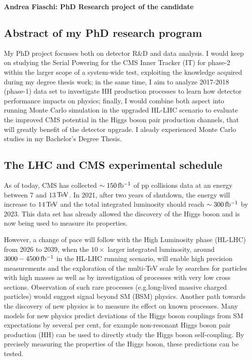 \documentclass[a4paper,11pt,english]{article}
\begin{document}

\pagestyle{plain}
\noindent


\begin{center}
\noindent  \large{\textbf{Andrea Fiaschi: PhD Research project of the candidate}}
\end{center} 
\vspace{-.3cm}
\vspace{-.2cm}
\subsection*{Abstract of my PhD research program}
My PhD project focusses both on detector R\&D and data analysis. I would keep on studying the Serial Powering for the CMS Inner Tracker (IT) for phase-2 within the larger scope of a system-wide test, exploiting the knowledge acquired during my degree thesis work; in the same time, I aim to analyze 2017-2018 (phase-1) data set to investigate HH production processes to learn how detector performance impacts on physics; finally, I would combine both aspect into running Monte Carlo simulation in the upgraded HL-LHC scenario to evaluate the improved CMS potential in the Higgs boson pair production channels, that will greatly benefit of the detector upgrade. I aleady experienced Monte Carlo studies in my Bachelor’s Degree Thesis\cite{TesiTriennale}.
\subsection*{The LHC and CMS experimental schedule}
As of today, CMS has collected $\sim 150{\rm \, fb^{-1}}$ of pp collisions data at an energy between 7 and 13${\rm \, Te\kern-0.125em V}$. In 2021, after two years of shutdown, the energy will increase to $14{\rm \, Te\kern-0.125em V}$ and the total integrated luminosity should reach $\sim 300{\rm \, fb^{-1}}$ by 2023. This data set has already allowed the discovery of the Higgs boson and is now being used to measure its properties.

However, a change of pace will follow with the High Luminosity phase (HL-LHC) from 2026 to 2039, when the $10\times$ larger integrated luminosity, around  $3000-4500{\rm \, fb^{-1}}$ in the HL-LHC running scenario, will enable high precision measurements and the
exploration of the multi-TeV scale by searches for particles with high masses as well as by investigation of processes with very low cross sections. Observation of such rare processes (e.g.long-lived massive charged particles) would suggest signal beyond SM (BSM) physics. %
Another path towards the discovery of new physics is to measure its effect on known processes. Many models for new physics predict deviations of the Higgs boson couplings from SM expectations by several per cent, for example non-resonant Higgs boson pair production (HH) can be used to directly study the Higgs boson self-coupling. By precisely measuring the properties of the Higgs boson, these predictions can be tested.
\end{document}
